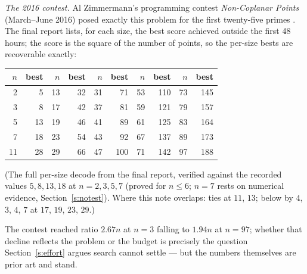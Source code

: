\documentclass[11pt,a4paper]{article}
\begin{document}
\emph{The 2016 contest.}  Al Zimmermann's programming contest \emph{Non-Coplanar Points}
(March--June 2016) posed exactly this problem for the first twenty-five primes \cite{AZsPCs}.
The final report lists, for each size, the best score achieved outside the first 48 hours; the
score is the square of the number of points, so the per-size bests are recoverable exactly:
\begin{center}
\begin{tabular}{rr|rr|rr|rr|rr}
\toprule
$n$ & best & $n$ & best & $n$ & best & $n$ & best & $n$ & best\\
\midrule
 2 &   5 & 13 &  32 & 31 &  71 & 53 & 110 & 73 & 145\\
 3 &   8 & 17 &  42 & 37 &  81 & 59 & 121 & 79 & 157\\
 5 &  13 & 19 &  46 & 41 &  89 & 61 & 125 & 83 & 164\\
 7 &  18 & 23 &  54 & 43 &  92 & 67 & 137 & 89 & 173\\
11 &  28 & 29 &  66 & 47 & 100 & 71 & 142 & 97 & 188\\
\bottomrule
\end{tabular}

\smallskip
{\small (The full per-size decode from the final report, verified against the recorded values $5,8,13,18$
at $n=2,3,5,7$ (proved for $n\le6$; $n=7$ rests on numerical evidence, Section~\ref{s:notest}).  Where this note overlaps: ties at $11$, $13$; below by $4$, $3$, $4$, $7$ at $17$, $19$,
$23$, $29$.)}
\end{center}
The contest reached ratio $2.67n$ at $n=3$ falling to $1.94n$ at $n=97$; whether that decline
reflects the problem or the budget is precisely the question Section~\ref{s:effort} argues
search cannot settle --- but the numbers themselves are prior art and stand.
\end{document}
